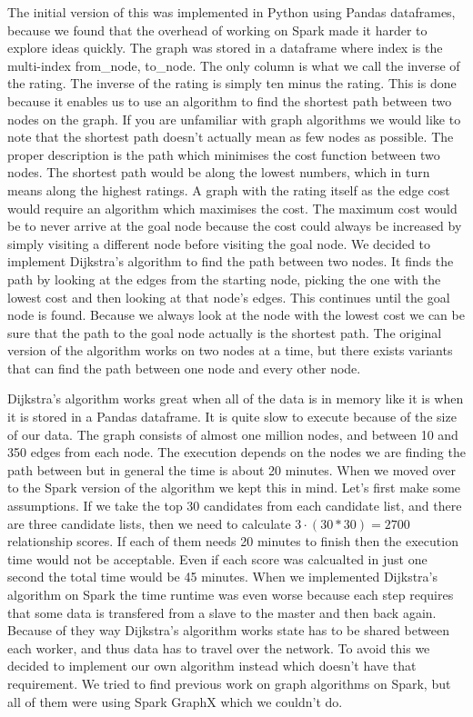 The initial version of this was implemented in Python using Pandas dataframes, because we found that the overhead of working on Spark made it harder to explore ideas quickly. The graph was stored in a dataframe where index is the multi-index from\_node, to\_node. The only column is what we call the inverse of the rating. The inverse of the rating is simply ten minus the rating. This is done because it enables us to use an algorithm to find the shortest path between two nodes on the graph. If you are unfamiliar with graph algorithms we would like to note that the shortest path doesn't actually mean as few nodes as possible. The proper description is the path which minimises the cost function between two nodes. The shortest path would be along the lowest numbers, which in turn means along the highest ratings. A graph with the rating itself as the edge cost would require an algorithm which maximises the cost. The maximum cost would be to never arrive at the goal node because the cost could always be increased by simply visiting a different node before visiting the goal node. We decided to implement Dijkstra's algorithm to find the path between two nodes. It finds the path by looking at the edges from the starting node, picking the one with the lowest cost and then looking at that node's edges. This continues until the goal node is found. Because we always look at the node with the lowest cost we can be sure that the path to the goal node actually is the shortest path. The original version of the algorithm works on two nodes at a time, but there exists variants that can find the path between one node and every other node.

Dijkstra's algorithm works great when all of the data is in memory like it is when it is stored in a Pandas dataframe. It is quite slow to execute because of the size of our data. The graph consists of almost one million nodes, and between 10 and 350 edges from each node. The execution depends on the nodes we are finding the path between but in general the time is about 20 minutes. When we moved over to the Spark version of the algorithm we kept this in mind. Let's first make some assumptions. If we take the top 30 candidates from each candidate list, and there are three candidate lists, then we need to calculate $3\cdot(30*30)=2700$ relationship scores. If each of them needs 20 minutes to finish then the execution time would not be acceptable. Even if each score was calcualted in just one second the total time would be 45 minutes. When we implemented Dijkstra's algorithm on Spark the time runtime was even worse because each step requires that some data is transfered from a slave to the master and then back again. Because of they way Dijkstra's algorithm works state has to be shared between each worker, and thus data has to travel over the network. To avoid this we decided to implement our own algorithm instead which doesn't have that requirement. We tried to find previous work on graph algorithms on Spark, but all of them were using Spark GraphX which we couldn't do.

